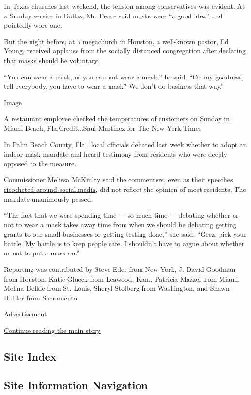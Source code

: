 In Texas churches last weekend, the tension among conservatives was
evident. At a Sunday service in Dallas, Mr. Pence said masks were ``a
good idea'' and pointedly wore one.

But the night before, at a megachurch in Houston, a well-known pastor,
Ed Young, received applause from the socially distanced congregation
after declaring that masks should be voluntary.

``You can wear a mask, or you can not wear a mask,'' he said. ``Oh my
goodness, tell everybody, you have to wear a mask? We don't do business
that way.''

Image

A restaurant employee checked the temperatures of customers on Sunday in
Miami Beach, Fla.Credit...Saul Martinez for The New York Times

In Palm Beach County, Fla., local officials debated last week whether to
adopt an indoor mask mandate and heard testimony from residents who were
deeply opposed to the measure.

Commissioner Melissa McKinlay said the commenters, even as their
\href{https://www.cnn.com/videos/politics/2020/06/24/mask-mandate-florida-anger-erupts-coronavirus-vpx.cnn}{speeches
ricocheted around social media}, did not reflect the opinion of most
residents. The mandate unanimously passed.

``The fact that we were spending time --- so much time --- debating
whether or not to wear a mask takes away time from when we should be
debating getting grants to our small businesses or getting testing
done,'' she said. ``Geez, pick your battle. My battle is to keep people
safe. I shouldn't have to argue about whether or not to put a mask on.''

Reporting was contributed by Steve Eder from New York, J. David Goodman
from Houston, Katie Glueck from Leawood, Kan., Patricia Mazzei from
Miami, Melina Delkic from St. Louis, Sheryl Stolberg from Washington,
and Shawn Hubler from Sacramento.

Advertisement

\protect\hyperlink{after-bottom}{Continue reading the main story}

\hypertarget{site-index}{%
\subsection{Site Index}\label{site-index}}

\hypertarget{site-information-navigation}{%
\subsection{Site Information
Navigation}\label{site-information-navigation}}

